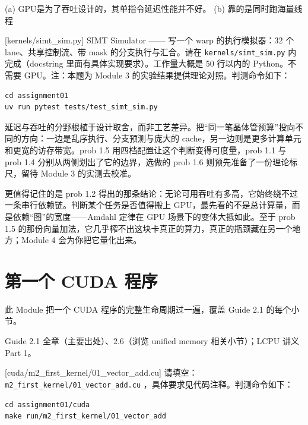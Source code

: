 \documentclass[11pt,a4paper,fontset=none]{ctexart}
\begin{document}
(a) GPU是为了吞吐设计的，其单指令延迟性能并不好。
(b) 靠的是同时跑海量线程

[kernels/simt\_sim.py]
SIMT Simulator —— 写一个 warp 的执行模拟器：32 个 lane、共享控制流、带 mask 的分支执行与汇合。请在 \texttt{kernels/simt\_sim.py} 内完成（docstring 里面有具体实现要求）。工作量大概是 50 行以内的 Python。不需要 GPU。注：本题为 Module 3 的实验结果提供理论对照。判测命令如下：

\begin{lstlisting}
cd assignment01
uv run pytest tests/test_simt_sim.py
\end{lstlisting}

\begin{lookback}
延迟与吞吐的分野根植于设计取舍，而非工艺差异。把“同一笔晶体管预算”投向不同的方向：一边是乱序执行、分支预测与庞大的 cache，另一边则是更多计算单元和更宽的访存带宽。prob 1.5 用四档配置让这个判断变得可度量，prob 1.1 与 prob 1.4 分别从两侧划出了它的边界，选做的 prob 1.6 则预先准备了一份理论标尺，留待 Module 3 的实测去校准。

更值得记住的是 prob 1.2 得出的那条结论：无论可用吞吐有多高，它始终绕不过一条串行依赖链。判断某个任务是否值得搬上 GPU，最先看的不是总计算量，而是依赖“图”的宽度——Amdahl 定律在 GPU 场景下的变体大抵如此。至于 prob 1.5 的那份向量加法，它几乎榨不出这块卡真正的算力，真正的瓶颈藏在另一个地方；Module 4 会为你把它量化出来。
\end{lookback}

\section{第一个 CUDA 程序}

此 Module 把一个 CUDA 程序的完整生命周期过一遍，覆盖 Guide 2.1 的每个小节。

\begin{reading}
Guide 2.1 全章（主要出处）、2.6（浏览 unified memory 相关小节）；LCPU 讲义 Part 1。
\end{reading}

[cuda/m2\_first\_kernel/01\_vector\_add.cu]
请填空：\texttt{m2\_first\_kernel/01\_vector\_add.cu} ，具体要求见代码注释。判测命令如下：

\begin{lstlisting}
cd assignment01/cuda
make run/m2_first_kernel/01_vector_add
\end{lstlisting}
\end{document}
